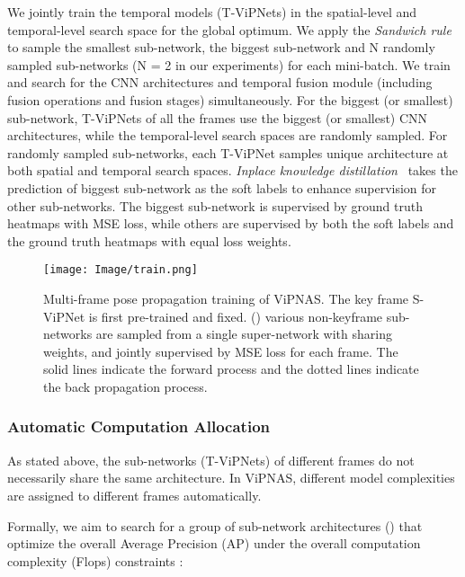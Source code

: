 \documentclass[final]{cvpr}
\begin{document}
We jointly train the temporal models (T-ViPNets) in the spatial-level and temporal-level search space for the global optimum. We apply the \emph{Sandwich rule}~\cite{yu2019universally,yu2020bignas} to sample the smallest sub-network, the biggest sub-network and N randomly sampled sub-networks (N = 2 in our experiments) for each mini-batch. We train and search for the CNN architectures and temporal fusion module (including fusion operations and fusion stages) simultaneously. For the biggest (or smallest) sub-network, T-ViPNets of all the frames use the biggest (or smallest) CNN architectures, while the temporal-level search spaces are randomly sampled. For  randomly sampled sub-networks, each T-ViPNet samples unique architecture at both spatial and temporal search spaces. 
\emph{Inplace knowledge distillation}~\cite{yu2019universally,yu2020bignas} takes the prediction of biggest sub-network as the soft labels to enhance supervision for other sub-networks. The biggest sub-network is supervised by ground truth heatmaps with MSE loss, while others are supervised by both the soft labels and the ground truth heatmaps with equal loss weights. 

\begin{figure}[htb]
	\centering
	\texttt{[image: Image/train.png]}
	\caption{Multi-frame pose propagation training of ViPNAS. The key frame S-ViPNet is first pre-trained and fixed.  () various non-keyframe sub-networks are sampled from a single super-network with sharing weights, and jointly supervised by MSE loss for each frame. The solid lines indicate the forward process and the dotted lines indicate the back propagation process.}
	\label{fig:train&search}
	\vspace{-8pt}
\end{figure}

\vspace{-5pt}
\subsubsection{Automatic Computation Allocation}

As stated above, the sub-networks (T-ViPNets) of different frames do not necessarily share the same architecture. In ViPNAS, different model complexities are assigned to different frames automatically. 

Formally, we aim to search for a group of sub-network architectures () that optimize the overall Average Precision (AP) under the overall computation complexity (Flops) constraints :
\end{document}
